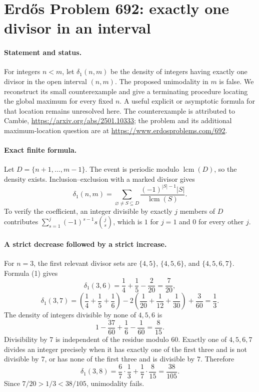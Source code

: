 \section*{Erd\H{o}s Problem 692: exactly one divisor in an interval}

\paragraph{Statement and status.}
For integers \(n<m\), let \(\delta_1(n,m)\) be the density of
integers having exactly one divisor in the open interval \((n,m)\).
The proposed unimodality in \(m\) is false. We reconstruct its
small counterexample and give a terminating procedure locating
the global maximum for every fixed \(n\). A useful explicit or
asymptotic formula for that location remains unresolved here.
The counterexample is attributed to Cambie,
\url{https://arxiv.org/abs/2501.10333};
the problem and its additional maximum-location question are at
\url{https://www.erdosproblems.com/692}.

\paragraph{Exact finite formula.}
Let \(D=\{n+1,\ldots,m-1\}\). The event is periodic modulo
\(\operatorname{lcm}(D)\), so the density exists. Inclusion--exclusion
with a marked divisor gives
\[
 \delta_1(n,m)=
 \sum_{\varnothing\ne S\subseteq D}
 \frac{(-1)^{|S|-1}|S|}{\operatorname{lcm}(S)}.                  \tag{1}
\]
To verify the coefficient, an integer divisible by exactly \(j\)
members of \(D\) contributes
\(\sum_{s=1}^j(-1)^{s-1}s\binom js\), which is \(1\) for \(j=1\)
and \(0\) for every other \(j\).

\paragraph{A strict decrease followed by a strict increase.}
For \(n=3\), the first relevant divisor sets are
\(\{4,5\}\), \(\{4,5,6\}\), and \(\{4,5,6,7\}\).
Formula (1) gives
\[
 \delta_1(3,6)=\frac14+\frac15-\frac2{20}=\frac7{20},
\]
\[
 \delta_1(3,7)=
 \left(\frac14+\frac15+\frac16\right)
 -2\left(\frac1{20}+\frac1{12}+\frac1{30}\right)
 +\frac3{60}=\frac13.
\]
The density of integers divisible by none of \(4,5,6\) is
\[
 1-\frac{37}{60}+\frac16-\frac1{60}=\frac8{15}.
\]
Divisibility by \(7\) is independent of the residue modulo \(60\).
Exactly one of \(4,5,6,7\) divides an integer precisely when it
has exactly one of the first three and is not divisible by \(7\),
or has none of the first three and is divisible by \(7\). Therefore
\[
 \delta_1(3,8)=\frac67\cdot\frac13+\frac17\cdot\frac8{15}
             =\frac{38}{105}.
\]
Since \(7/20>1/3<38/105\), unimodality fails.

